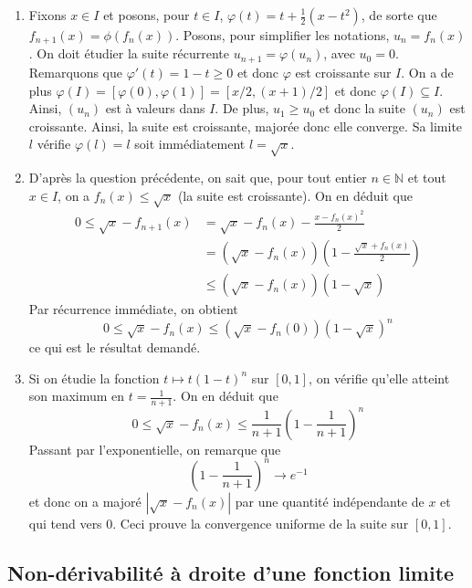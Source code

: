 \begin{enumerate}
    \item Fixons $x\in I$ et posons, pour $t\in I$, $\varphi(t)=t+\frac{1}{2}(x-t^2)$, de sorte que $f_{n+1}(x)=\phi(f_n(x))$. Posons, pour simplifier les notations, $u_n=f_n(x)$. On doit étudier la suite récurrente $u_{n+1}=\varphi(u_n)$, avec $u_0=0$. Remarquons que $\varphi'(t)=1-t\geqslant 0$ et donc $\varphi$ est croissante sur $I$. On a de plus $\varphi(I)=[\varphi(0),\varphi(1)]=[x/2,(x+1)/2]$ et donc $\varphi(I)\subseteq I$. Ainsi, $(u_n)$ est à valeurs dans $I$. De plus, $u_1\geqslant u_0$ et donc la suite $(u_n)$ est croissante. Ainsi, la suite est croissante, majorée donc elle converge. Sa limite $l$ vérifie $\varphi(l)=l$ soit immédiatement $l=\sqrt{x}$.
    \item D'après la question précédente, on sait que, pour tout entier $n\in\mathbb{N}$ et tout $x\in I$, on a $f_n(x)\leqslant \sqrt{x}$ (la suite est croissante). On en déduit que 
        \[
            \begin{aligned}
                0\leqslant \sqrt x-{f_{n+1}(x)}&=\sqrt x-f_n(x)-\frac{x-f_n(x)^2}{2}\\
                &=(\sqrt x-f_n(x))\left(1-\frac{\sqrt{x}+f_n(x)}{2}\right)\\
                &\leqslant(\sqrt x-f_n(x))(1-\sqrt{x})
            \end{aligned}
        \]
        Par récurrence immédiate, on obtient
        \[
            0\leqslant \sqrt{x}-f_n(x)\leqslant (\sqrt{x}-f_n(0))(1-\sqrt{x})^n
        \]
        ce qui est le résultat demandé.
    \item Si on étudie la fonction $t\mapsto t(1-t)^n$ sur $[0,1]$, on vérifie qu'elle atteint son maximum en $t=\frac{1}{n+1}$. On en déduit que
        \[
            0\leqslant \sqrt{x}-f_n(x)\leqslant \frac{1}{n+1}\left(1-\frac{1}{n+1}\right)^n
        \]
        Passant par l'exponentielle, on remarque que 
        \[
            \left(1-\frac{1}{n+1}\right)^n\to e^{-1}
        \]
        et donc on a majoré $|\sqrt{x}-f_n(x)|$ par une quantité indépendante de $x$ et qui tend vers 0. Ceci prouve la convergence uniforme de la suite sur $[0,1]$.
\end{enumerate}

\subsection{Non-dérivabilité à droite d'une fonction limite}

